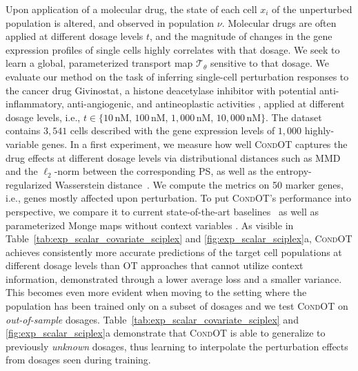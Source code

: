  Upon application of a molecular drug, the state of each cell $x_i$ of the unperturbed population is altered, and observed in population $\nu$.
Molecular drugs are often applied at different dosage levels $t$, and the magnitude of changes in the gene expression profiles of single cells highly correlates with that dosage. 
We seek to learn a global, parameterized transport map $\mathcal{T}_\theta$ sensitive to that dosage.%
We evaluate our method on the task of inferring single-cell perturbation responses to the cancer drug Givinostat, a histone deacetylase inhibitor with potential anti-inflammatory, anti-angiogenic, and antineoplastic activities \citep{srivatsan2020massively}, applied at different dosage levels, i.e., $t \in \{10\,$nM, $100\,$nM, $1,000\,$nM, $10,000\,$nM$\}$. The dataset contains $3,541$ cells described with the gene expression levels of $1,000$ highly-variable genes.
In a first experiment, we measure how well \textsc{CondOT} captures the drug effects at different dosage levels via distributional distances such as MMD~\citep{gretton2012kernel} and the $\ell_2$-norm between the corresponding \acrfull{PS}, as well as the entropy-regularized Wasserstein distance~\citep{cuturi2013sinkhorn}. We compute the metrics on 50 marker genes, i.e., genes mostly affected upon perturbation.
To put \textsc{CondOT}'s performance into perspective, we compare it to current state-of-the-art baselines~\citep{lotfollahi2021compositional} as well as parameterized Monge maps without context variables \citep[\textsc{ICNN OT}]{bunne2021learning, makkuva2020optimal}.
As visible in Table~\ref{tab:exp_scalar_covariate_sciplex} and \cref{fig:exp_scalar_sciplex}a, \textsc{CondOT} achieves consistently more accurate predictions of the target cell populations at different dosage levels than OT approaches that cannot utilize context information, demonstrated through a lower average loss and a smaller variance.
This becomes even more evident when moving to the setting where the population has been trained only on a subset of dosages and we test \textsc{CondOT} on \emph{out-of-sample} dosages. Table~\ref{tab:exp_scalar_covariate_sciplex} and \cref{fig:exp_scalar_sciplex}a demonstrate that \textsc{CondOT} is able to generalize to previously \emph{unknown} dosages, thus learning to interpolate the perturbation effects from dosages seen during training.

